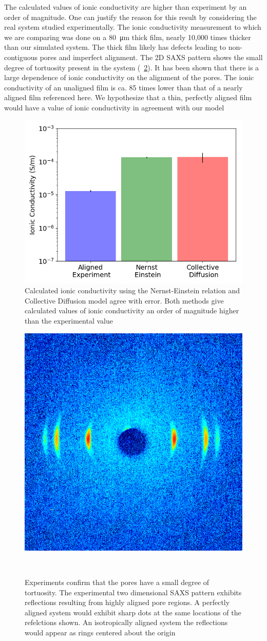 \documentclass{article}
\begin{document}
  The calculated values of ionic conductivity are higher than experiment by an
  order of magnitude. One can justify the reason for this result by considering
  the real system studied experimentally. The ionic conductivity measurement to
  which we are comparing was done on a \SI{80}{\micro\metre} thick film, nearly
  10,000 times thicker than our simulated system. The thick film likely has
  defects leading to non-contiguous pores and imperfect alignment. The 2D SAXS
  pattern shows the small degree of tortuosity present in the system
  (~\ref{fig:2DSAXS}). It has been shown that there is a large dependence of
  ionic conductivity on the alignment of the pores. The ionic conductivity of an
  unaligned film is ca. 85 times lower than that of a nearly aligned film
  referenced here. We hypothesize that a thin, perfectly aligned film would have
  a value of ionic conductivity in agreement with our model

  \begin{figure}
        \centering
        \includegraphics[width=0.5\linewidth]{IC_offset.png}
        \caption{Calculated ionic conductivity using the Nernst-Einstein relation
        and Collective Diffusion model agree with error. Both methods give calculated
        values of ionic conductivity an order of magnitude higher than the experimental
        value}
        \label{fig:conductivity}
  \end{figure}

  \begin{figure}
  \centering
  \includegraphics[width=0.5\linewidth]{2D-SAXS_cropped.png}
  \caption{Experiments confirm that the pores have a small degree of tortuosity. 
  The experimental two dimensional SAXS pattern exhibits reflections
  resulting from highly aligned pore regions. A perfectly aligned system 
  would exhibit sharp dots at the same locations of the refelctions shown. 
  An isotropically aligned system the reflections would appear as 
  rings centered about the origin}~\label{fig:2DSAXS}
  \end{figure}
\end{document}
